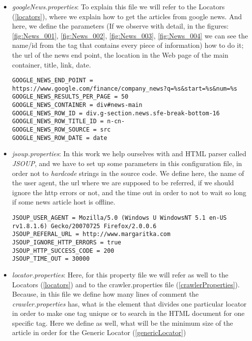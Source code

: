 \begin{itemize}
	\item \emph{googleNews.properties}: To explain this file we will refer to the Locators (\ref{locators}), where we explain how to get the articles from google news. And here, we define the parameters (If we observe with detail, in the figures: \ref{fig:News_001}, \ref{fig:News_002}, \ref{fig:News_003}, \ref{fig:News_004}  we can see the name/id from the tag that contains every piece of information) how to do it; the url of the news end point, the location in the Web page of the main container, title, link, date. 
	
\begin{lstlisting}
GOOGLE_NEWS_END_POINT = https://www.google.com/finance/company_news?q=%s&start=%s&num=%s
GOOGLE_NEWS_RESULTS_PER_PAGE = 50
GOOGLE_NEWS_CONTAINER = div#news-main
GOOGLE_NEWS_ROW_ID = div.g-section.news.sfe-break-bottom-16
GOOGLE_NEWS_ROW_TITLE_ID = n-cn-
GOOGLE_NEWS_ROW_SOURCE = src
GOOGLE_NEWS_ROW_DATE = date
\end{lstlisting}	
	
	\item \emph{jsoup.properties}: In this work we help ourselves with and HTML parser called \emph{JSOUP}, and we have to set up some parameters in this configuration file, in order not to \emph{hardcode} strings in the source code. We define here, the name of the user agent, the url where we are supposed to be referred, if we should ignore the http errors or not, and the time out in order to not to wait so long if some news article host is offline.
	
\begin{lstlisting}
JSOUP_USER_AGENT = Mozilla/5.0 (Windows U WindowsNT 5.1 en-US rv1.8.1.6) Gecko/20070725 Firefox/2.0.0.6
JSOUP_REFERAL_URL = http://www.margaritka.com
JSOUP_IGNORE_HTTP_ERRORS = true
JSOUP_HTTP_SUCCESS_CODE = 200
JSOUP_TIME_OUT = 30000
\end{lstlisting}
	
	\item \emph{locator.properties}: Here, for this property file we will refer as well to the Locators (\ref{locators}) and to the crawler.properties file (\ref{crawlerProperties}). Because, in this file we define how many lines of comment the \emph{crawler.properties} has, what is the element that divides one particular locator in order to make one tag unique or to search in the HTML document for one specific tag. Here we define as well, what will be the minimum size of the article in order for the Generic Locator (\ref{genericLocator})
	

\end{itemize}
